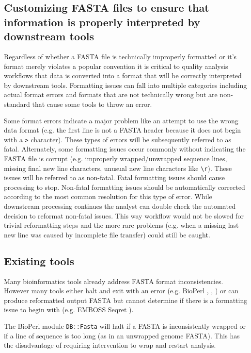 \subsection{Customizing FASTA files to ensure that information is properly interpreted by downstream tools}

Regardless of whether a FASTA file is technically improperly formatted or it's format merely violates a popular convention it is critical to quality analysis workflows that data is converted into a format that will be correctly interpreted by downstream tools. Formatting issues can fall into multiple categories including actual format errors and formats that are not technically wrong but are non-standard that cause some tools to throw an error. 

Some format errors indicate a major problem like an attempt to use the wrong data format (e.g. the first line is not a FASTA header because it does not begin with a \verb|>| character). These types of errors will be subsequently referred to as fatal. Alternately, some formatting issues occur commonly without indicating the FASTA file is corrupt (e.g. improperly wrapped/unwrapped sequence lines, missing final new line characters, unusual new line characters like \verb|\r|). These issues will be referred to as non-fatal. Fatal formatting issues should cause processing to stop. Non-fatal formatting issues should be automatically corrected according to the most common resolution for this type of error. While downstream processing continues the analyst can double check the automated decision to reformat non-fatal issues. This way workflow would not be slowed for trivial reformatting steps and the more rare problems (e.g. when a missing last new line was caused by incomplete file transfer) could still be caught.
  
\subsection{Existing tools}

Many bioinformatics tools already address FASTA format inconsistencies. However many tools either halt and exit with an error (e.g. BioPerl \cite{bioperl}, \cite{bioperl2}, \cite{bioperl3}) or can produce reformatted output FASTA but cannot determine if there is a formatting issue to begin with (e.g. EMBOSS Seqret \cite{PMID:10827456}). 

The BioPerl module \verb|DB::Fasta| will halt if a FASTA is inconsistently wrapped or if a line of sequence is too long (as in an unwrapped genome FASTA). This has the disadvantage of requiring intervention to wrap and restart analysis.

